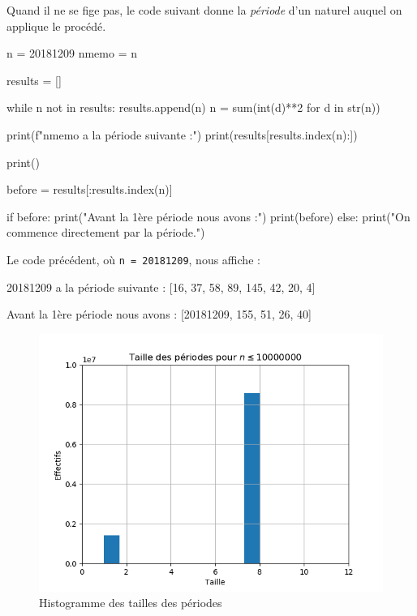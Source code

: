 Quand il ne se fige pas, le code suivant donne la \textit{\og période \fg} d'un naturel auquel on applique le procédé.

\begin{rawcode}
n     = 20181209
nmemo = n

results = []

while n not in results:
    results.append(n)
    n = sum(int(d)**2 for d in str(n))

print(f"{nmemo} a la période suivante :")
print(results[results.index(n):])

print()

before = results[:results.index(n)]

if before:
    print("Avant la 1ère période nous avons :")
    print(before)
else:
    print("On commence directement par la période.")
\end{rawcode}

\medskip

Le code précédent, où \verb+n = 20181209+, nous affiche :

\begin{rawcode}
20181209 a la période suivante :
[16, 37, 58, 89, 145, 42, 20, 4]

Avant la 1ère période nous avons :
[20181209, 155, 51, 26, 40]
\end{rawcode}


\medskip

\begin{figure}[b]
	\centering
	\includegraphics[scale=.9]{squares-int/periods.png}
  	\caption{Histogramme des tailles des périodes}
	\label{histogram}
\end{figure}



